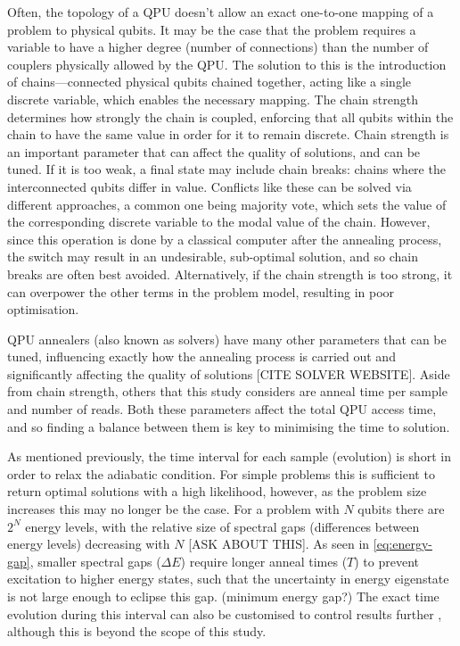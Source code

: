 \documentclass[12pt]{article}
\theoremstyle{definition}
\begin{document}
Often, the topology of a QPU doesn't allow an exact one-to-one mapping of a problem to physical qubits. It may be the case that the problem requires a variable to have a higher degree (number of connections) than the number of couplers physically allowed by the QPU. The solution to this is the introduction of chains---connected physical qubits chained together, acting like a single discrete variable, which enables the necessary mapping. The chain strength determines how strongly the chain is coupled, enforcing that all qubits within the chain to have the same value in order for it to remain discrete. Chain strength is an important parameter that can affect the quality of solutions, and can be tuned. If it is too weak, a final state may include chain breaks: chains where the interconnected qubits differ in value. Conflicts like these can be solved via different approaches, a common one being majority vote, which sets the value of the corresponding discrete variable to the modal value of the chain. However, since this operation is done by a classical computer after the annealing process, the switch may result in an undesirable, sub-optimal solution, and so chain breaks are often best avoided. Alternatively, if the chain strength is too strong, it can overpower the other terms in the problem model, resulting in poor optimisation.

QPU annealers (also known as solvers) have many other parameters that can be tuned, influencing exactly how the annealing process is carried out and significantly affecting the quality of solutions [CITE SOLVER WEBSITE]. Aside from chain strength, others that this study considers are anneal time per sample and number of reads. Both these parameters affect the total QPU access time, and so finding a balance between them is key to minimising the time to solution.

As mentioned previously, the time interval for each sample (evolution) is short in order to relax the adiabatic condition. For simple problems this is sufficient to return optimal solutions with a high likelihood, however, as the problem size increases this may no longer be the case. For a problem with $N$ qubits there are $2^N$ energy levels, with the relative size of spectral gaps (differences between energy levels) decreasing with $N$ [ASK ABOUT THIS]. As seen in \cref{eq:energy-gap}, smaller spectral gaps ($\Delta E$) require longer anneal times ($T$) to prevent excitation to higher energy states, such that the uncertainty in energy eigenstate is not large enough to eclipse this gap. (minimum energy gap?) The exact time evolution during this interval can also be customised to control results further \cite{khezri_customized_2022}, although this is beyond the scope of this study.
\end{document}
